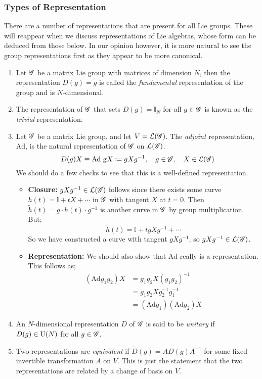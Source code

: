 \subsubsection{Types of Representation}
There are a number of representations that are present for all Lie groups. These will reappear when we discuss representations of Lie algebras, whose form can be deduced from those below. In our opinion however, it is more natural to see the group representations first as they appear to be more canonical.
\begin{enumerate}
\item Let $\mathscr{G}$ be a matrix Lie group with matrices of dimension $N$, then the representation $D(g) = g$ is called the \emph{fundamental} representation of the group and is $N$-dimensional.
\item The representation of $\mathscr{G}$ that sets $D(g) = \mathbb{I}_N$ for all $g \in \mathscr{G}$ is known as the \emph{trivial} representation.
\item Let $\mathscr{G}$ be a matrix Lie group, and let $V = \mathcal{L}(\mathscr{G})$. The \emph{adjoint} representation, $\text{Ad}$, is the natural representation of $\mathscr{G}$ on $\mathcal{L}(\mathscr{G})$.
\begin{equation}
D(g)X \equiv \text{Ad g}X \coloneqq g X g^{-1}, \quad g \in \mathscr{G}, \quad X \in \mathcal{L}(\mathscr{G})
\end{equation}
We should do a few checks to see that this is a well-defined representation.
\begin{itemize}
\item \textbf{Closure:} $g X g^{-1} \in \mathcal{L}(\mathscr{G})$ follows since there exists some curve $h(t) = \mathbb{I} + t X + \cdots$ in $\mathscr{G}$ with tangent $X$ at $t = 0$. Then $\tilde{h}(t) = g\cdot h(t)\cdot g^{-1}$ is another curve in $\mathscr{G}$ by group multiplication. But;
\begin{equation*}
\tilde{h}(t) = \mathbb{I} + t gX g^{-1} + \cdots
\end{equation*}
So we have constructed a curve with tangent $gX g^{-1}$, so $g X g^{-1} \in \mathcal{L}(\mathscr{G})$. 
\item \textbf{Representation:} We should also show that $\text{Ad}$ really is a representation. This follows as;
\begin{align*}
(\text{Ad}g_1 g_2)X &= g_1 g_2 X (g_1 g_2)^{-1} \\
&= g_1 g_2 X g_2^{-1} g_1^{-1} \\
&= \left(\text{Ad}g_1\right)\left(\text{Ad}g_2\right)X
\end{align*}
\end{itemize}
\item An $N$-dimensional representation $D$ of $\mathscr{G}$ is said to be \emph{unitary} if $D(g) \in \Uni{N}$ for all $g \in \mathscr{G}$.
\item Two representations are \emph{equivalent} if $\tilde{D}(g) = AD(g)A^{-1}$ for some fixed invertible transformation $A$ on $V$. This is just the statement that the two representations are related by a change of basis on $V$.
\end{enumerate}

















